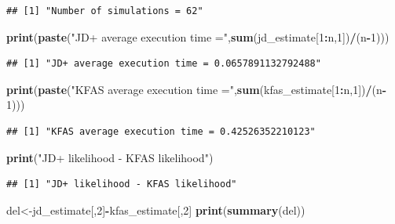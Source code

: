 \documentclass[]{article}
\newenvironment{Shaded}{\begin{snugshade}}{\end{snugshade}}
\newcommand{\KeywordTok}[1]{\textcolor[rgb]{0.13,0.29,0.53}{\textbf{#1}}}
\newcommand{\DecValTok}[1]{\textcolor[rgb]{0.00,0.00,0.81}{#1}}
\newcommand{\StringTok}[1]{\textcolor[rgb]{0.31,0.60,0.02}{#1}}
\newcommand{\OperatorTok}[1]{\textcolor[rgb]{0.81,0.36,0.00}{\textbf{#1}}}
\newcommand{\NormalTok}[1]{#1}
\begin{document}
\begin{verbatim}
## [1] "Number of simulations = 62"
\end{verbatim}

\begin{Shaded}
\begin{Highlighting}[]
\KeywordTok{print}\NormalTok{(}\KeywordTok{paste}\NormalTok{(}\StringTok{"JD+ average execution time ="}\NormalTok{,}\KeywordTok{sum}\NormalTok{(jd_estimate[}\DecValTok{1}\OperatorTok{:}\NormalTok{n,}\DecValTok{1}\NormalTok{])}\OperatorTok{/}\NormalTok{(n}\OperatorTok{-}\DecValTok{1}\NormalTok{)))}
\end{Highlighting}
\end{Shaded}

\begin{verbatim}
## [1] "JD+ average execution time = 0.0657891132792488"
\end{verbatim}

\begin{Shaded}
\begin{Highlighting}[]
\KeywordTok{print}\NormalTok{(}\KeywordTok{paste}\NormalTok{(}\StringTok{"KFAS average execution time ="}\NormalTok{,}\KeywordTok{sum}\NormalTok{(kfas_estimate[}\DecValTok{1}\OperatorTok{:}\NormalTok{n,}\DecValTok{1}\NormalTok{])}\OperatorTok{/}\NormalTok{(n}\OperatorTok{-}\DecValTok{1}\NormalTok{)))}
\end{Highlighting}
\end{Shaded}

\begin{verbatim}
## [1] "KFAS average execution time = 0.42526352210123"
\end{verbatim}

\begin{Shaded}
\begin{Highlighting}[]
\KeywordTok{print}\NormalTok{(}\StringTok{"JD+ likelihood - KFAS likelihood"}\NormalTok{)}
\end{Highlighting}
\end{Shaded}

\begin{verbatim}
## [1] "JD+ likelihood - KFAS likelihood"
\end{verbatim}

\begin{Shaded}
\begin{Highlighting}[]
\NormalTok{del<-jd_estimate[,}\DecValTok{2}\NormalTok{]}\OperatorTok{-}\NormalTok{kfas_estimate[,}\DecValTok{2}\NormalTok{]}
\KeywordTok{print}\NormalTok{(}\KeywordTok{summary}\NormalTok{(del))}
\end{Highlighting}
\end{Shaded}
\end{document}
